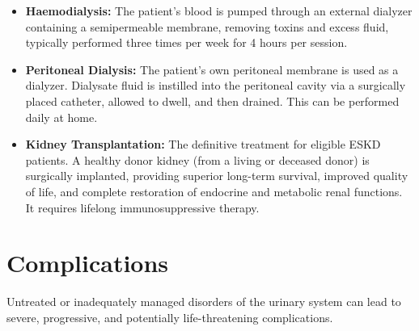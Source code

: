 \begin{itemize}
    \begin{itemize}
        \item \textbf{Haemodialysis:} The patient's blood is pumped through an external dialyzer containing a semipermeable membrane, removing toxins and excess fluid, typically performed three times per week for 4 hours per session.
        \item \textbf{Peritoneal Dialysis:} The patient's own peritoneal membrane is used as a dialyzer. Dialysate fluid is instilled into the peritoneal cavity via a surgically placed catheter, allowed to dwell, and then drained. This can be performed daily at home.
        \item \textbf{Kidney Transplantation:} The definitive treatment for eligible ESKD patients. A healthy donor kidney (from a living or deceased donor) is surgically implanted, providing superior long-term survival, improved quality of life, and complete restoration of endocrine and metabolic renal functions. It requires lifelong immunosuppressive therapy.
    \end{itemize}
\end{itemize}

\section*{Complications}
Untreated or inadequately managed disorders of the urinary system can lead to severe, progressive, and potentially life-threatening complications.

